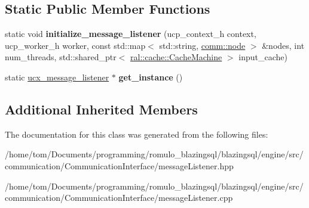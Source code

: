 \subsection*{Static Public Member Functions}
\begin{DoxyCompactItemize}
\item 
\mbox{\label{classcomm_1_1ucx__message__listener_a4e3a3be029f7adec46687eb7e21960d8}} 
static void {\bfseries initialize\+\_\+message\+\_\+listener} (ucp\+\_\+context\+\_\+h context, ucp\+\_\+worker\+\_\+h worker, const std\+::map$<$ std\+::string, \hyperlink{classcomm_1_1node}{comm\+::node} $>$ \&nodes, int num\+\_\+threads, std\+::shared\+\_\+ptr$<$ \hyperlink{classral_1_1cache_1_1CacheMachine}{ral\+::cache\+::\+Cache\+Machine} $>$ input\+\_\+cache)
\item 
\mbox{\label{classcomm_1_1ucx__message__listener_acac26d88ea164d0836c3fa494842ed1b}} 
static \hyperlink{classcomm_1_1ucx__message__listener}{ucx\+\_\+message\+\_\+listener} $\ast$ {\bfseries get\+\_\+instance} ()
\end{DoxyCompactItemize}
\subsection*{Additional Inherited Members}


The documentation for this class was generated from the following files\+:\begin{DoxyCompactItemize}
\item 
/home/tom/\+Documents/programming/romulo\+\_\+blazingsql/blazingsql/engine/src/communication/\+Communication\+Interface/message\+Listener.\+hpp\item 
/home/tom/\+Documents/programming/romulo\+\_\+blazingsql/blazingsql/engine/src/communication/\+Communication\+Interface/message\+Listener.\+cpp\end{DoxyCompactItemize}
